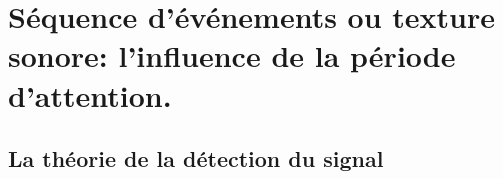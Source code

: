 \chapter{Séquence d'événements ou texture sonore: l'influence de la période d'attention.}
\label{app:xp_texture}

\section{La théorie de la détection du signal}
\label{app:sdt}